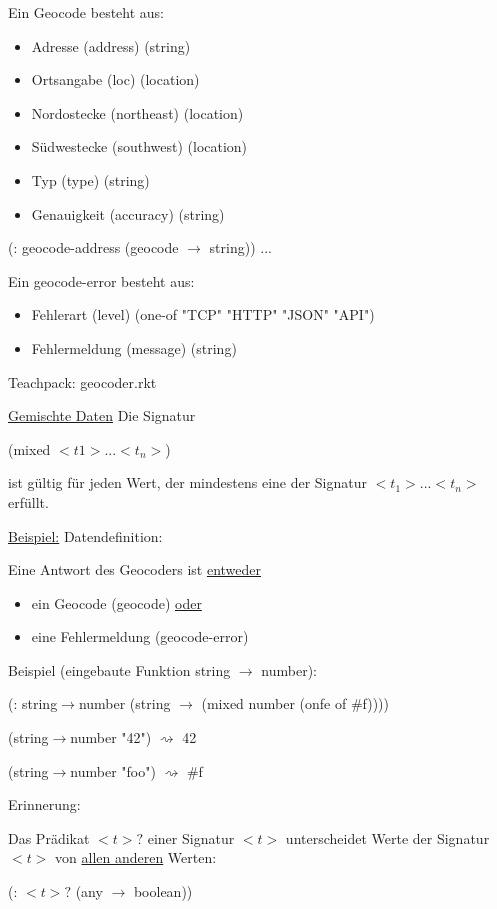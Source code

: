\documentclass[a4paper, 20pt, openany]{book}
\begin{document}
Ein Geocode besteht aus:
\begin{itemize}
  \item Adresse (address) (string)
  \item Ortsangabe (loc) (location)
  \item Nordostecke (northeast) (location)
  \item Südwestecke (southwest) (location)
  \item Typ (type) (string)
  \item Genauigkeit (accuracy) (string)
\end{itemize}

(: geocode-address (geocode $\rightarrow$ string)) ...

Ein geocode-error besteht aus: 
\begin{itemize}
  \item Fehlerart (level) (one-of "TCP" "HTTP" "JSON" "API")
  \item Fehlermeldung (message) (string)
\end{itemize}

Teachpack: geocoder.rkt

\underline{Gemischte Daten}
Die Signatur
\begin{center}
  (mixed $<t1>...<t_n>$)
\end{center}

ist gültig für jeden Wert, der mindestens eine der Signatur $<t_1>...<t_n>$ erfüllt.

\underline{Beispiel:} Datendefinition:

Eine Antwort des Geocoders ist \underline{entweder}
\begin{itemize}
  \item ein Geocode (geocode) \underline{oder}
  \item eine Fehlermeldung (geocode-error)
\end{itemize}

Beispiel (eingebaute Funktion string $\rightarrow$ number):

(: string$\rightarrow$number (string $\rightarrow$ (mixed number (onfe of \#f))))

(string$\rightarrow$number "42") $\rightsquigarrow$ 42

(string$\rightarrow$number "foo") $\rightsquigarrow$ \#f

Erinnerung:

Das Prädikat $<t>?$ einer Signatur $<t>$ unterscheidet Werte der Signatur $<t>$ von \underline{allen anderen} Werten:

(: $<t>?$ (any $\rightarrow$ boolean))
\end{document}
